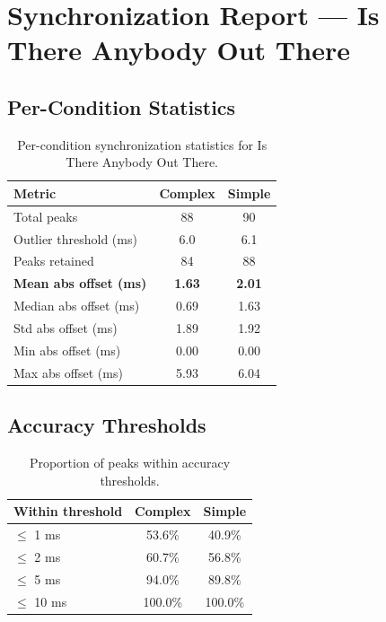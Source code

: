 
\section*{Synchronization Report --- Is There Anybody Out There}

\subsection*{Per-Condition Statistics}

\begin{table}[h!]
\centering
\begin{tabular}{|l|c|c|}
\hline
Metric & Complex & Simple \\
\hline
Total peaks & 88 & 90 \\
Outlier threshold (ms) & 6.0 & 6.1 \\
Peaks retained & 84 & 88 \\
\textbf{Mean abs offset (ms)} & \textbf{1.63} & \textbf{2.01} \\
Median abs offset (ms) & 0.69 & 1.63 \\
Std abs offset (ms) & 1.89 & 1.92 \\
Min abs offset (ms) & 0.00 & 0.00 \\
Max abs offset (ms) & 5.93 & 6.04 \\
\hline
\end{tabular}
\caption{Per-condition synchronization statistics for Is There Anybody Out There.}
\label{tab:sync_stats}
\end{table}

\subsection*{Accuracy Thresholds}

\begin{table}[h!]
\centering
\begin{tabular}{|l|c|c|}
\hline
Within threshold & Complex & Simple \\
\hline
$\leq$ 1 ms & 53.6\% & 40.9\% \\
$\leq$ 2 ms & 60.7\% & 56.8\% \\
$\leq$ 5 ms & 94.0\% & 89.8\% \\
$\leq$ 10 ms & 100.0\% & 100.0\% \\
\hline
\end{tabular}
\caption{Proportion of peaks within accuracy thresholds.}
\label{tab:sync_accuracy}
\end{table}


